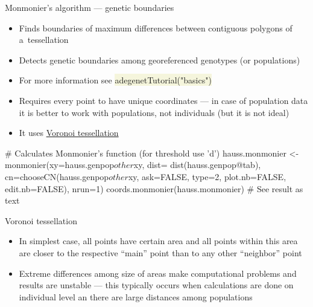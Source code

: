\documentclass[compress, ucs, xelatex, 11pt, xcolor=svgnames, aspectratio=169,
	hyperref={
		bookmarks=true,
		unicode=true,
		colorlinks=true,
		pdftitle={Molecular data in R},
		plainpages=false,
		pdfauthor={Vojtech Zeisek},
		pdfsubject={Course about phylogeny and evolution in R},
		pdfcreator={XeLaTeX},
		pdfkeywords={R, evolution, phylogeny, molecular data},
		linkcolor=Crimson, %
		anchorcolor=Magenta, %
		citecolor=Magenta, %
		filecolor=Magenta, %
		menucolor=Magenta, %
		urlcolor=DodgerBlue, %
		pdftex},
	url={hyphens, lowtilde} %
	]{beamer}
\renewcommand{\texttt}[1]{\colorbox{Beige}{{\ttfamily #1}}}
\begin{document}
\begin{frame}[fragile]{Monmonier's algorithm --- genetic boundaries}
	\begin{itemize}
		\item Finds boundaries of maximum differences between contiguous polygons of a~tessellation
		\item Detects genetic boundaries among georeferenced genotypes (or populations)
		\item For more information see \texttt{adegenetTutorial("basics")}
		\item Requires every point to have unique coordinates --- in case of population data it is better to work with populations, not individuals (but it is not ideal)
		\item It uses \href{https://en.wikipedia.org/wiki/Voronoi_diagram}{Voronoi tessellation}
	\end{itemize}
	\begin{spluscode}
    # Calculates Monmonier's function (for threshold use 'd')
    hauss.monmonier <- monmonier(xy=hauss.genpop$other$xy, dist=
      dist(hauss.genpop@tab), cn=chooseCN(hauss.genpop$other$xy,
      ask=FALSE, type=2, plot.nb=FALSE, edit.nb=FALSE), nrun=1)
    coords.monmonier(hauss.monmonier) # See result as text
	\end{spluscode}
\end{frame}

\begin{frame}{Voronoi tessellation}
	\begin{multicols}{2}
		\texttt{[image: voronoi\_diagram.png]}
		\begin{itemize}
			\item In simplest case, all points have certain area and all points within this area are closer to the respective \enquote{main} point than to any other \enquote{neighbor} point
			\item Extreme differences among size of areas make computational problems and results are unstable --- this typically occurs when calculations are done on individual level an there are large distances among populations
		\end{itemize}
	\end{multicols}
\end{frame}
\end{document}
